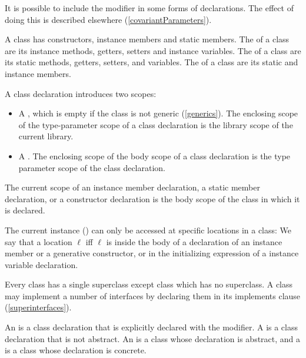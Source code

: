 \documentclass[makeidx]{article}
\begin{document}
\LMHash{}%
It is possible to include the modifier \COVARIANT{}
in some forms of declarations.
The effect of doing this is described elsewhere
(\ref{covariantParameters}).

\LMHash{}%
A class has constructors, instance members and static members.
The  of a class
are its instance methods, getters, setters and instance variables.
The  of a class
are its static methods, getters, setters, and variables.
The  of a class
are its static and instance members.

\LMHash{}%
A class declaration introduces two scopes:
\begin{itemize}
\item
  A ,
  which is empty if the class is not generic (\ref{generics}).
  The enclosing scope of the type-parameter scope of a class declaration is
  the library scope of the current library.
\item
  A .
  The enclosing scope of the body scope of a class declaration is
  the type parameter scope of the class declaration.
\end{itemize}

\LMHash{}%
The current scope of an instance member declaration,
a static member declaration,
or a constructor declaration is
the body scope of the class in which it is declared.

\LMHash{}%
The current instance
()
can only be accessed at specific locations in a class:
We say that a location $\ell$
if{}f $\ell$ is inside the body of a declaration of
an instance member or a generative constructor,
or in the initializing expression of a \LATE{} instance variable declaration.


\LMHash{}%
Every class has a single superclass
except class  which has no superclass.
A class may implement a number of interfaces
by declaring them in its implements clause (\ref{superinterfaces}).

\LMHash{}%
An 
is a class declaration that is explicitly declared
with the \ABSTRACT{} modifier.
A 
is a class declaration that is not abstract.
An  is a class
whose declaration is abstract, and
a  is a class
whose declaration is concrete.
\end{document}
